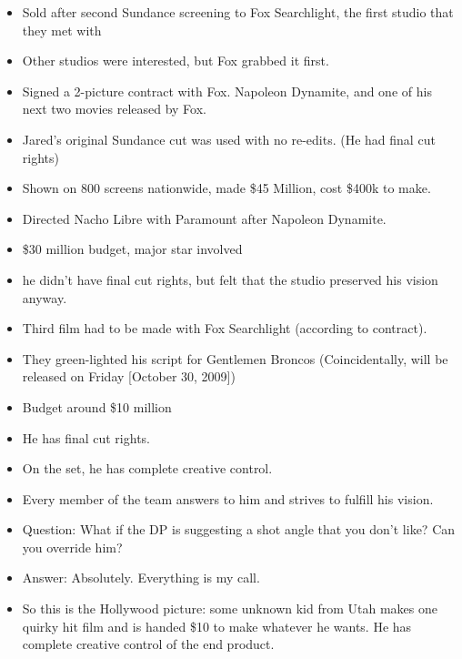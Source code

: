 \documentclass[12pt]{article}
\begin{document}
{\begin{itemize}
\item Sold after second Sundance screening to Fox Searchlight, the first studio that they met with

\item Other studios were interested, but Fox grabbed it first.

\item Signed a 2-picture contract with Fox.  Napoleon Dynamite, and one of his next two movies released by Fox.

\item Jared's original Sundance cut was used with no re-edits. (He had final cut rights)

\item Shown on 800 screens nationwide, made \$45 Million, cost \$400k to make. 

\item Directed Nacho Libre with Paramount after Napoleon Dynamite.  

\item \$30 million budget, major star involved

\item he didn't have final cut rights, but felt that the studio preserved his vision anyway.

\item Third film had to be made with Fox Searchlight (according to contract).

\item They green-lighted his script for Gentlemen Broncos (Coincidentally, will be released on Friday [October 30, 2009])

\item Budget around \$10 million

\item He has final cut rights.

\item On the set, he has complete creative control.  

\item Every member of the team answers to him and strives to fulfill his vision.

\item Question:  What if the DP is suggesting a shot angle that you don't like?  Can you override him?

\item Answer:  Absolutely.  Everything is my call.

\item So this is the Hollywood picture:  some unknown kid from Utah makes one quirky hit film and is handed \$10 to make whatever he wants.  He has complete creative control of the end product.



\end{itemize}}
\end{document}
